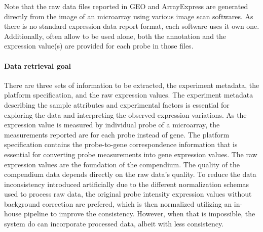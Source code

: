 Note that the raw data files reported in GEO and ArrayExpress are
generated directly from the image of an microarray using various image
scan softwares.
%
As there is no standard expression data report format, each software uses it
own one.
%
Additionally, often allow to be used alone, both the annotation and the
expression value(s) are provided for each probe in those files.






\paragraph{Data retrieval goal}\label{sec:command-data-goal}

There are three sets of information to be extracted, the experiment metadata,
the platform specification, and the raw expression values.
%
%
The experiment metadata describing the sample attributes and experimental
factors is essential for exploring the data and interpreting the observed
expression variations.
%
As the expression value is measured by individual probe of a microarray, the
measurements reported are for each probe instead of gene.
%
The platform specification contains the probe-to-gene correspondence
information that is essential for converting probe measurements into gene
expression values.
%
%
The raw expression values are the foundation of the compendium.  The quality of
the compendium data depends directly on the raw data's quality.
%
To reduce the data inconsistency introduced artificially due to the different
normalization schemas used to process raw data, the original probe intensity
expression values without background correction are prefered, which is then
normalized utilizing an in-house pipeline to improve the consistency.
%
However, when that is impossible, the system do can incorporate processed data,
albeit with less consistency.
%
